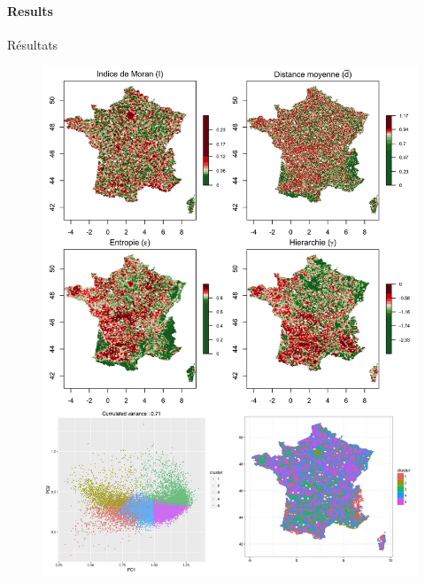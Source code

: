 
\paragraph{Results}{Résultats}



\begin{figure}
\includegraphics[width=0.9\linewidth]{Figures/Final/4-1-1-fig-staticcorrelations-empirical}

\end{figure}
